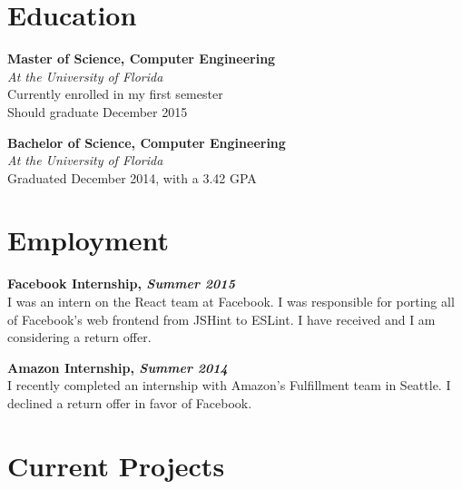\documentclass[11pt, letterpaper]{article}
\begin{document}



\section{Education}

\begin{multicols}{2}
\raggedcolumns
\textbf{Master of Science, Computer Engineering} \\
\textit{At the University of Florida} \\
Currently enrolled in my first semester \\
Should graduate December 2015

\columnbreak

\textbf{Bachelor of Science, Computer Engineering} \\
\textit{At the University of Florida} \\
Graduated December 2014, with a 3.42 GPA
\end{multicols}


\section{Employment}

\begin{multicols}{2}
\raggedcolumns
\textbf{Facebook Internship, \textit{Summer 2015}} \\
I was an intern on the React team at Facebook. I was responsible for porting all
of Facebook’s web frontend from JSHint to ESLint. I have received and I am
considering a return offer.

\columnbreak

\textbf{Amazon Internship, \textit{Summer 2014}} \\
I recently completed an internship with Amazon’s Fulfillment team in Seattle.
I declined a return offer in favor of Facebook.
\end{multicols}


\section{Current Projects}
\end{document}
